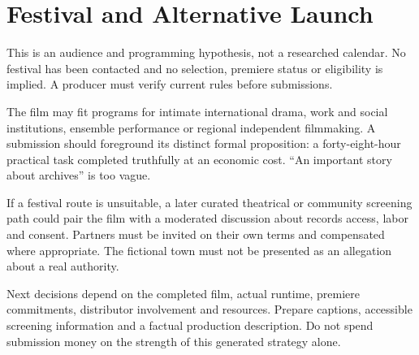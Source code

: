 \section{Festival and Alternative Launch}
This is an audience and programming hypothesis, not a researched calendar. No festival has been contacted and no selection, premiere status or eligibility is implied. A producer must verify current rules before submissions.

The film may fit programs for intimate international drama, work and social institutions, ensemble performance or regional independent filmmaking. A submission should foreground its distinct formal proposition: a forty-eight-hour practical task completed truthfully at an economic cost. ``An important story about archives'' is too vague.

If a festival route is unsuitable, a later curated theatrical or community screening path could pair the film with a moderated discussion about records access, labor and consent. Partners must be invited on their own terms and compensated where appropriate. The fictional town must not be presented as an allegation about a real authority.

Next decisions depend on the completed film, actual runtime, premiere commitments, distributor involvement and resources. Prepare captions, accessible screening information and a factual production description. Do not spend submission money on the strength of this generated strategy alone.
